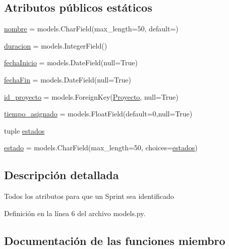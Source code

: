 \subsection*{Atributos públicos estáticos}
\begin{DoxyCompactItemize}
\item 
\hyperlink{class_sprints_1_1models_1_1_sprint_a69a53233e03770e3e83ce7a97736d7f1}{nombre} = models.\+Char\+Field(max\+\_\+length=50, default=\textquotesingle{}\textquotesingle{})
\item 
\hyperlink{class_sprints_1_1models_1_1_sprint_a21683e638d8cfe5a2c7f5963d9b2cf17}{duracion} = models.\+Integer\+Field()
\item 
\hyperlink{class_sprints_1_1models_1_1_sprint_a7993b1db9672285b74bf48be881dd068}{fecha\+Inicio} = models.\+Date\+Field(null=True)
\item 
\hyperlink{class_sprints_1_1models_1_1_sprint_a218867a666420d6b2cec0503b5079881}{fecha\+Fin} = models.\+Date\+Field(null=True)
\item 
\hyperlink{class_sprints_1_1models_1_1_sprint_ae5815ea36c2c34f5eed0c61b6f89254b}{id\+\_\+proyecto} = models.\+Foreign\+Key(\hyperlink{classproyectos_1_1models_1_1_proyecto}{Proyecto}, null=True)
\item 
\hyperlink{class_sprints_1_1models_1_1_sprint_a666d4cc2bd3ba38f47babbc20ac61025}{tiempo\+\_\+asignado} = models.\+Float\+Field(default=0,null=True)
\item 
tuple \hyperlink{class_sprints_1_1models_1_1_sprint_a261ff3c709405026d85a3dfe47610d93}{estados}
\item 
\hyperlink{class_sprints_1_1models_1_1_sprint_a2a9784349eba1639bf4aca9c72c98c5b}{estado} = models.\+Char\+Field(max\+\_\+length=50, choices=\hyperlink{class_sprints_1_1models_1_1_sprint_a261ff3c709405026d85a3dfe47610d93}{estados})
\end{DoxyCompactItemize}


\subsection{Descripción detallada}
\begin{DoxyVerb}Todos los atributos para que un Sprint sea identificado\end{DoxyVerb}
 

Definición en la línea 6 del archivo models.\+py.



\subsection{Documentación de las funciones miembro}
